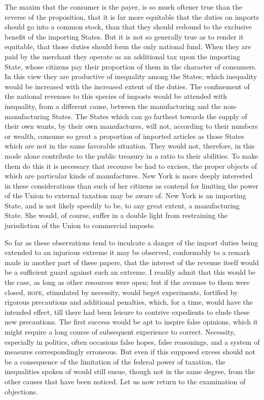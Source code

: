 The maxim that the consumer is the payer, is so much oftener true than the reverse of the proposition, that it is far more equitable that the duties on imports should go into a common stock, than that they should redound to the exclusive benefit of the importing States. But it is not so generally true as to render it equitable, that those duties should form the only national fund. When they are paid by the merchant they operate as an additional tax upon the importing State, whose citizens pay their proportion of them in the character of consumers. In this view they are productive of inequality among the States; which inequality would be increased with the increased extent of the duties. The confinement of the national revenues to this species of imposts would be attended with inequality, from a different cause, between the manufacturing and the non-manufacturing States. The States which can go farthest towards the supply of their own wants, by their own manufactures, will not, according to their numbers or wealth, consume so great a proportion of imported articles as those States which are not in the same favorable situation. They would not, therefore, in this mode alone contribute to the public treasury in a ratio to their abilities. To make them do this it is necessary that recourse be had to excises, the proper objects of which are particular kinds of manufactures. New York is more deeply interested in these considerations than such of her citizens as contend for limiting the power of the Union to external taxation may be aware of. New York is an importing State, and is not likely speedily to be, to any great extent, a manufacturing State. She would, of course, suffer in a double light from restraining the jurisdiction of the Union to commercial imposts.

So far as these observations tend to inculcate a danger of the import duties being extended to an injurious extreme it may be observed, conformably to a remark made in another part of these papers, that the interest of the revenue itself would be a sufficient guard against such an extreme. I readily admit that this would be the case, as long as other resources were open; but if the avenues to them were closed, \textsc{hope}, stimulated by necessity, would beget experiments, fortified by rigorous precautions and additional penalties, which, for a time, would have the intended effect, till there had been leisure to contrive expedients to elude these new precautions. The first success would be apt to inspire false opinions, which it might require a long course of subsequent experience to correct. Necessity, especially in politics, often occasions false hopes, false reasonings, and a system of measures correspondingly erroneous. But even if this supposed excess should not be a consequence of the limitation of the federal power of taxation, the inequalities spoken of would still ensue, though not in the same degree, from the other causes that have been noticed. Let us now return to the examination of objections.

